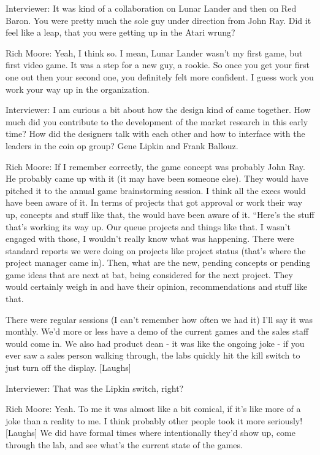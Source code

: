 \textcolor{interviewer}{Interviewer:} It was kind of a collaboration on Lunar Lander and then on Red Baron. You were pretty much the sole guy under direction from John Ray. Did it feel like a leap, that you were getting up in the Atari wrung?

\textcolor{interviewee}{Rich Moore:} Yeah, I think so. I mean, Lunar Lander wasn't my first game, but first video game. It was a step for a new guy, a rookie. So once you get your first one out then your second one, you definitely felt more confident. I guess work you work your way up in the organization.

\textcolor{interviewer}{Interviewer:} I am curious a bit about how the design kind of came together. How much did you contribute to the development of the market research in this early time? How did the designers talk with each other and how to interface with the leaders in the coin op group? Gene Lipkin and Frank Ballouz.

\textcolor{interviewee}{Rich Moore:} If I remember correctly, the game concept was probably John Ray. He probably came up with it (it may have been someone else). They would have pitched it to the annual game brainstorming session. I think all the execs would have been aware of it. In terms of projects that got approval or work their way up, concepts and stuff like that, the would have been aware of it. “Here's the stuff that's working its way up. Our queue projects and things like that. 
I wasn't engaged with those, I wouldn't really know what was happening. There were standard reports we were doing on projects like project status (that's where the project manager came in). Then, what are the new, pending concepts or pending game ideas that are next at bat, being considered for the next project. They would certainly weigh in and have their opinion, recommendations and stuff like that.

There were regular sessions (I can’t remember how often we had it) I’ll say it was monthly. We'd more or less have a demo of the current games and the sales staff would come in. We also had product dean - it was like the ongoing joke - if you ever saw a sales person walking through, the labs quickly hit the kill switch to just turn off the display. [Laughs]

\textcolor{interviewer}{Interviewer:} That was the Lipkin switch, right?

\textcolor{interviewee}{Rich Moore:} Yeah. To me it was almost like a bit comical, if it's like more of a joke than a reality to me. I think probably other people took it more seriously! [Laughs] We did have formal times where intentionally they’d show up, come through the lab, and see what's the current state of the games.

